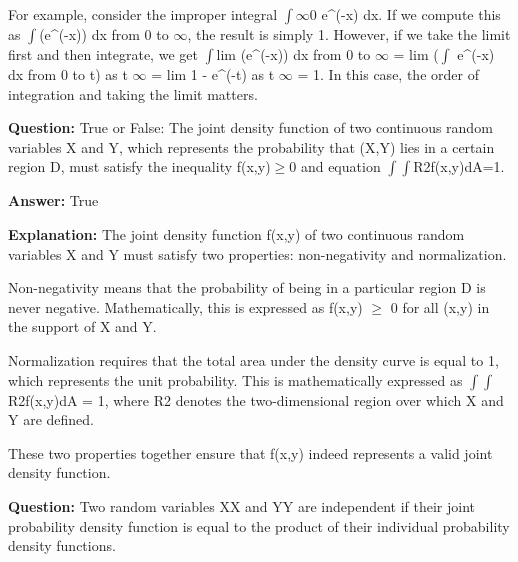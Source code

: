 \documentclass{article}
\begin{document}
For example, consider the improper integral \ensuremath{\int}\ensuremath{\infty}0 e{\textasciicircum}(-x) dx. If we compute this as \ensuremath{\int}(e{\textasciicircum}(-x)) dx from 0 to \ensuremath{\infty}, the result is simply 1. However, if we take the limit first and then integrate, we get \ensuremath{\int}lim (e{\textasciicircum}(-x)) dx from 0 to \ensuremath{\infty} = lim (\ensuremath{\int} e{\textasciicircum}(-x) dx from 0 to t) as t {\textrightarrow} \ensuremath{\infty} = lim 1 - e{\textasciicircum}(-t) as t {\textrightarrow} \ensuremath{\infty} = 1. In this case, the order of integration and taking the limit matters.
                
                \vspace{0.5cm} 
        
            
                \textbf {Question:} True or False: The joint density function of two continuous random variables X and Y, which represents the probability that (X,Y) lies in a certain region D, must satisfy the inequality f(x,y)\ensuremath{\geq}0 and equation \ensuremath{\int}\ensuremath{\int}R2f(x,y)dA=1.
                
                \textbf{Answer:} True

                \textbf{Explanation:} The joint density function f(x,y) of two continuous random variables X and Y must satisfy two properties: non-negativity and normalization.

Non-negativity means that the probability of being in a particular region D is never negative. Mathematically, this is expressed as f(x,y) \ensuremath{\geq} 0 for all (x,y) in the support of X and Y.

Normalization requires that the total area under the density curve is equal to 1, which represents the unit probability. This is mathematically expressed as \ensuremath{\int}\ensuremath{\int}R2f(x,y)dA = 1, where R2 denotes the two-dimensional region over which X and Y are defined.

These two properties together ensure that f(x,y) indeed represents a valid joint density function.
                
                \vspace{0.5cm} 
        
            
                \textbf {Question:} Two random variables XX and YY are independent if their joint probability density function is equal to the product of their individual probability density functions.
                
\end{document}
